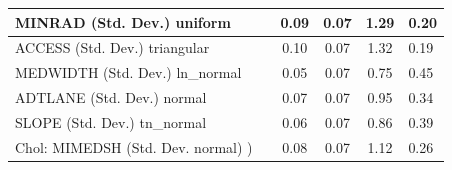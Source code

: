 \begin{table}
\begin{center}
\begin{tabular}{|l|l|c|c|c|l|}
			\hline
			MINRAD (Std. Dev.) uniform &  & 0.09 & 0.07 & 1.29 & 0.20 \\
			\hline
			ACCESS (Std. Dev.) triangular &  & 0.10 & 0.07 & 1.32 & 0.19 \\
			\hline
			MEDWIDTH (Std. Dev.) ln_normal &  & 0.05 & 0.07 & 0.75 & 0.45 \\
			\hline
			ADTLANE (Std. Dev.) normal &  & 0.07 & 0.07 & 0.95 & 0.34 \\
			\hline
			SLOPE (Std. Dev.) tn_normal &  & 0.06 & 0.07 & 0.86 & 0.39 \\
			\hline
			 Chol: MIMEDSH (Std. Dev. normal) ) &  & 0.08 & 0.07 & 1.12 & 0.26 \\
			\hline
		\end{tabular}
	\end{center}
\end{table}